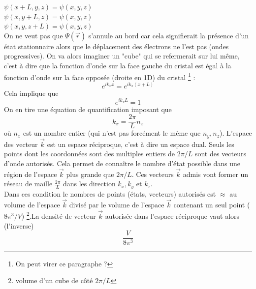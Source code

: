  $\psi (x+L, y, z) = \psi (x, y, z)$ \\
 $\psi (x, y+L, z) = \psi (x, y, z)$ \\
 $\psi (x, y, z+L) = \psi (x, y, z)$ \\

On ne veut pas que $\Psi(\vec{r})$ s'annule au bord car cela 
signifierait la présence d'un état stationnaire alors que le déplacement 
des électrons ne l'est pas (ondes progressives). On va alors imaginer 
un "cube" qui se refermerait sur lui même, c'est à dire que la fonction 
d'onde sur la face gauche du cristal est égal à la 
fonction d'onde sur la face opposée (droite en 1D) du cristal \footnote{On peut virer ce paragraphe ?} :
\begin{equation}
	e^{ik_xx} = e^{ik_x(x+L)}
\end{equation}
Cela implique que 
\begin{equation}
	e^{ik_xL} = 1
\end{equation}
On en tire une équation de quantification imposant que
\begin{equation}
	k_x = \frac{2\pi}{L}n_x
\end{equation}
où $n_x$ est un nombre entier (qui n'est pas forcément le même 
que $n_y, n_z$). L'espace des vecteur $\vec{k}$ est un espace 
réciproque, c'est à dire un espace dual. Seuls les points dont les 
coordonnées sont des multiples entiers de $2\pi/L$ sont des vecteurs 
d'onde autorisés. Cela permet de connaître le nombre d'état possible 
dans une région de l'espace $\vec{k}$ plus grande que $2\pi/L$. 
Ces vecteurs $\vec k$ admis vont former un réseau de maille
$\frac{2\pi}{L}$ dans les direction $k_x,k_y$ et $k_z$.\\

Dans ces condition le nombres de points (états, vecteurs) autorisés 
est $\approx$ au volume de l'espace $\vec{k}$ divisé par le volume 
de l'espace $\vec{k}$ contenant un seul point ($8\pi^3/V$) \footnote{
volume d'un cube de côté $2\pi /L$}.La densité 
de vecteur $\vec{k}$ autorisée dans l'espace réciproque vaut alors 
(l'inverse) 
\begin{equation}
	\frac{V}{8\pi^3}
\end{equation}

